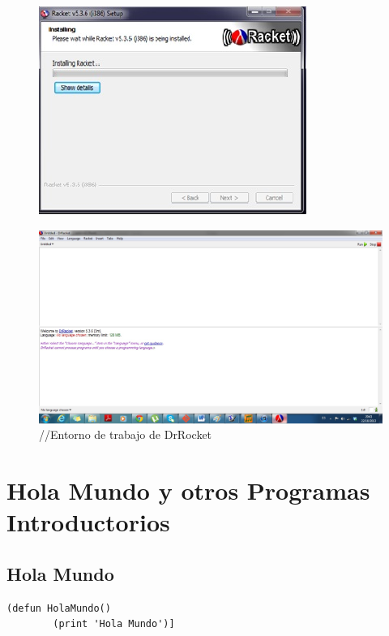 \documentclass[11pt]{article} %
\begin{document}
\begin{figure}[h]
\centering
    \includegraphics{imagenes_investigacion/paso_cuatro.jpg}
\caption { }
\label{Figura 4}
\end{figure}


\begin{figure}[h]
\centering
    \includegraphics[width=450pts] {imagenes_investigacion/entorno.jpg}
\caption {//Entorno de trabajo de DrRocket}
\label{Figura 5}
\end{figure}



\section{Hola Mundo y otros Programas Introductorios}


\subsection{Hola Mundo}
\lstset{language=LISP}          

\begin{lstlisting}[frame=single] 
	(defun HolaMundo()
		(print 'Hola Mundo')]

\end{lstlisting}
\end{document}
